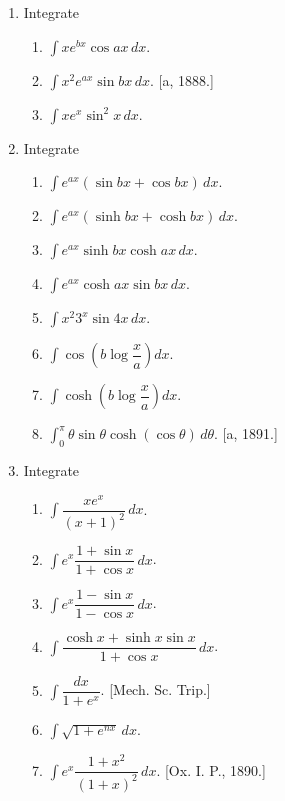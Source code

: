 \documentclass[11pt, a4paper]{article}
\newcommand{\source}[1]{\hfill\textnormal{[#1]}}
\begin{document}
\begin{enumerate}[leftmargin=2em]
\item Integrate
\begin{enumerate}[label=(\roman*)]
\item $\displaystyle\int xe^{bx}\cos ax\,dx$.
\item $\displaystyle\int x^2e^{ax}\sin bx\,dx$. \source{a, 1888.}
\item $\displaystyle\int xe^x\sin^2x\,dx$.
\end{enumerate}

\item Integrate
\begin{enumerate}[label=(\roman*)]
\item $\displaystyle\int e^{ax}(\sin bx+\cos bx)\,dx$.
\item $\displaystyle\int e^{ax}(\sinh bx+\cosh bx)\,dx$.
\item $\displaystyle\int e^{ax}\sinh bx\cosh ax\,dx$.
\item $\displaystyle\int e^{ax}\cosh ax\sin bx\,dx$.
\item $\displaystyle\int x^2 3^x\sin 4x\,dx$.
\item $\displaystyle\int \cos\left(b\log\dfrac{x}{a}\right)dx$.
\item $\displaystyle\int \cosh\left(b\log\dfrac{x}{a}\right)dx$.
\item $\displaystyle\int_0^\pi \theta\sin\theta\cosh(\cos\theta)\,d\theta$. \source{a, 1891.}
\end{enumerate}

\item Integrate
\begin{enumerate}[label=(\roman*)]
\item $\displaystyle\int \dfrac{xe^x}{(x+1)^2}\,dx$.
\item $\displaystyle\int e^x\dfrac{1+\sin x}{1+\cos x}\,dx$.
\item $\displaystyle\int e^x\dfrac{1-\sin x}{1-\cos x}\,dx$.
\item $\displaystyle\int \dfrac{\cosh x+\sinh x\sin x}{1+\cos x}\,dx$.
\item $\displaystyle\int \dfrac{dx}{1+e^x}$. \source{Mech. Sc. Trip.}
\item $\displaystyle\int \sqrt{1+e^{nx}}\,dx$.
\item $\displaystyle\int e^x\dfrac{1+x^2}{(1+x)^2}\,dx$. \source{Ox. I. P., 1890.}
\end{enumerate}


\end{enumerate}
\end{document}
